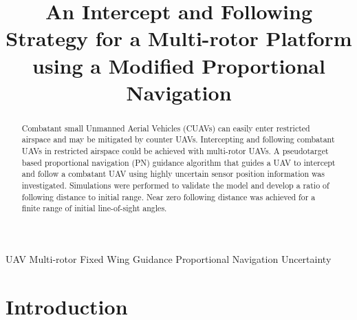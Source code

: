\documentclass[conference]{IEEEtran}
\begin{document}
\title{An Intercept and Following Strategy for a Multi-rotor Platform using a Modified Proportional Navigation}

\author{
\and
{}
}

\maketitle


\begin{abstract}
	Combatant small Unmanned Aerial Vehicles (CUAVs) can easily enter restricted airspace and may be mitigated by counter UAVs. Intercepting and following combatant UAVs in restricted airspace could be achieved with multi-rotor UAVs. A pseudotarget based proportional navigation (PN) guidance algorithm that guides a UAV to intercept and follow a combatant UAV using highly uncertain sensor position information was investigated. Simulations were performed to validate the model and develop a ratio of following distance to initial range. Near zero following distance was achieved for a finite range of initial line-of-sight angles.
\end{abstract}

\begin{IEEEkeywords}
	UAV
	Multi-rotor
	Fixed Wing
	Guidance
	Proportional Navigation
	Uncertainty

\end{IEEEkeywords}

\section{Introduction}
\end{document}
